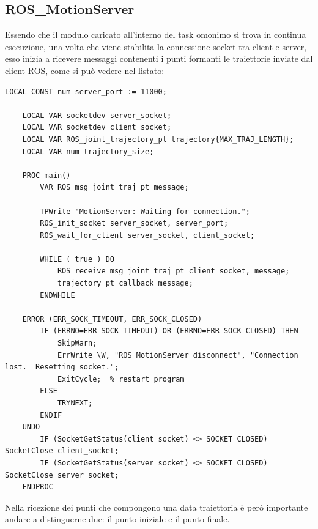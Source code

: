 \subsection{ROS\_MotionServer}
Essendo che il modulo caricato all'interno del task omonimo si trova in continua esecuzione, una volta che viene stabilita la connessione socket tra client e server, esso inizia a ricevere messaggi contenenti i punti formanti le traiettorie inviate dal client ROS, come si può vedere nel listato:
\begin{lstlisting}[style=Matlab-editor,caption=Ricezione delle traiettorie con relativo controllo d'integrità,captionpos=b,label={Code:ROSMotionServer},basicstyle=\scriptsize\ttfamily,frame=trBL]
	LOCAL CONST num server_port := 11000;
	
	LOCAL VAR socketdev server_socket;
	LOCAL VAR socketdev client_socket;
	LOCAL VAR ROS_joint_trajectory_pt trajectory{MAX_TRAJ_LENGTH};
	LOCAL VAR num trajectory_size;
	
	PROC main()
		VAR ROS_msg_joint_traj_pt message;
		
		TPWrite "MotionServer: Waiting for connection.";
		ROS_init_socket server_socket, server_port;
		ROS_wait_for_client server_socket, client_socket;
		
		WHILE ( true ) DO
			ROS_receive_msg_joint_traj_pt client_socket, message;
			trajectory_pt_callback message;
		ENDWHILE
		
	ERROR (ERR_SOCK_TIMEOUT, ERR_SOCK_CLOSED)
		IF (ERRNO=ERR_SOCK_TIMEOUT) OR (ERRNO=ERR_SOCK_CLOSED) THEN
			SkipWarn;  
			ErrWrite \W, "ROS MotionServer disconnect", "Connection lost.  Resetting socket.";
			ExitCycle;  % restart program
		ELSE
			TRYNEXT;
		ENDIF
	UNDO
		IF (SocketGetStatus(client_socket) <> SOCKET_CLOSED) SocketClose client_socket;
		IF (SocketGetStatus(server_socket) <> SOCKET_CLOSED) SocketClose server_socket;
	ENDPROC
\end{lstlisting}

Nella ricezione dei punti che compongono una data traiettoria è però importante andare a distinguerne due: il punto iniziale e il punto finale.

